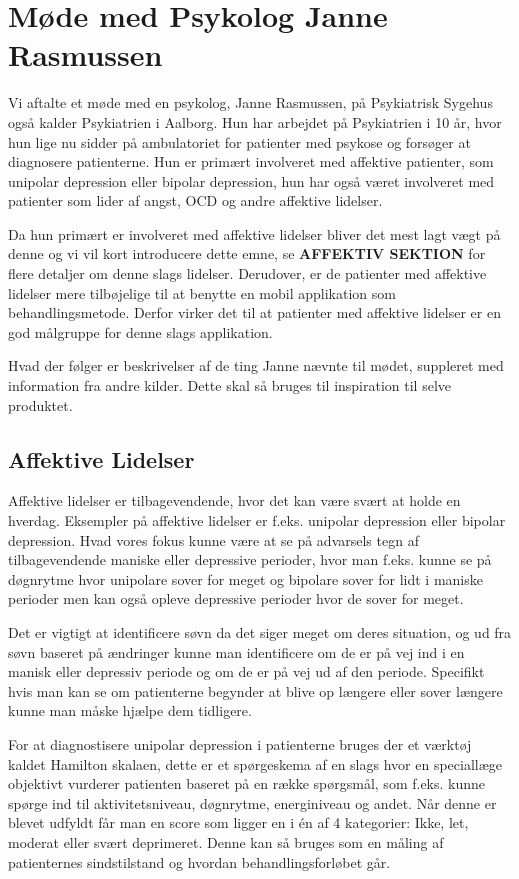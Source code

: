 \section{Møde med Psykolog Janne Rasmussen}
Vi aftalte et møde med en psykolog, Janne Rasmussen, på Psykiatrisk Sygehus også kalder Psykiatrien i Aalborg.
Hun har arbejdet på Psykiatrien i 10 år, hvor hun lige nu sidder på ambulatoriet for patienter med psykose og forsøger at diagnosere patienterne. 
Hun er primært involveret med affektive patienter, som unipolar depression eller bipolar depression, hun har også været involveret med patienter som lider af angst, OCD og andre affektive lidelser.

Da hun primært er involveret med affektive lidelser bliver det mest lagt vægt på denne og vi vil kort introducere dette emne, se \textbf{AFFEKTIV SEKTION} for flere detaljer om denne slags lidelser.
Derudover, er de patienter med affektive lidelser mere tilbøjelige til at benytte en mobil applikation som behandlingsmetode.
Derfor virker det til at patienter med affektive lidelser er en god målgruppe for denne slags applikation.

Hvad der følger er beskrivelser af de ting Janne nævnte til mødet, suppleret med information fra andre kilder. 
Dette skal så bruges til inspiration til selve produktet.

\subsection{Affektive Lidelser}
Affektive lidelser er tilbagevendende, hvor det kan være svært at holde en hverdag.
Eksempler på affektive lidelser er f.eks. unipolar depression eller bipolar depression.
Hvad vores fokus kunne være at se på advarsels tegn af tilbagevendende maniske eller depressive perioder, hvor man f.eks. kunne se på døgnrytme hvor unipolare sover for meget og bipolare sover for lidt i maniske perioder men kan også opleve depressive perioder hvor de sover for meget.

Det er vigtigt at identificere søvn da det siger meget om deres situation, og ud fra søvn baseret på ændringer kunne man identificere om de er på vej ind i en manisk eller depressiv periode og om de er på vej ud af den periode. 
Specifikt hvis man kan se om patienterne begynder at blive op længere eller sover længere kunne man måske hjælpe dem tidligere.

For at diagnostisere unipolar depression i patienterne bruges der et værktøj kaldet Hamilton skalaen, dette er et spørgeskema af en slags hvor en speciallæge objektivt vurderer patienten baseret på en række spørgsmål, som f.eks. kunne spørge ind til aktivitetsniveau, døgnrytme, energiniveau og andet.
Når denne er blevet udfyldt får man en score som ligger en i én af 4 kategorier: Ikke, let, moderat eller svært deprimeret. 
Denne kan så bruges som en måling af patienternes sindstilstand og hvordan behandlingsforløbet går.

